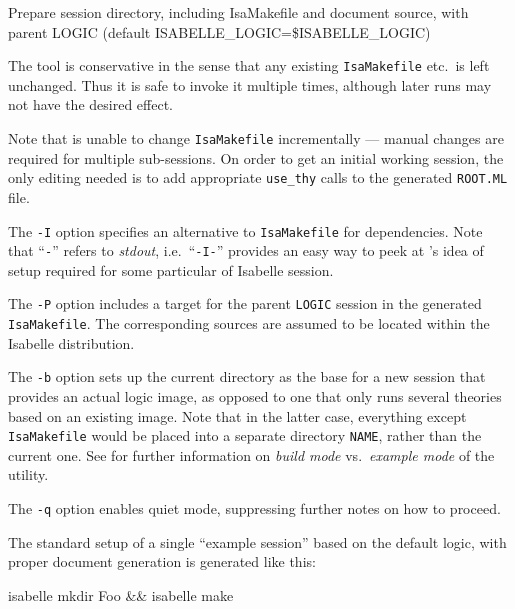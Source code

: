 \begin{isabellebody}
\begin{isamarkuptext}
\begin{ttbox}
  Prepare session directory, including IsaMakefile and document source,
  with parent LOGIC (default ISABELLE_LOGIC=\$ISABELLE_LOGIC)
\end{ttbox}

  The \hyperlink{tool.mkdir}{\mbox{}} tool is conservative in the sense that any
  existing \verb|IsaMakefile| etc.\ is left unchanged.  Thus it
  is safe to invoke it multiple times, although later runs may not
  have the desired effect.

  Note that \hyperlink{tool.mkdir}{\mbox{}} is unable to change \verb|IsaMakefile|
  incrementally --- manual changes are required for multiple
  sub-sessions.  On order to get an initial working session, the only
  editing needed is to add appropriate \verb|use_thy| calls to the
  generated \verb|ROOT.ML| file.%
\end{isamarkuptext}%
\isamarkuptrue%
%
\isamarkuptrue%
%
\begin{isamarkuptext}%
The \verb|-I| option specifies an alternative to \verb|IsaMakefile| for dependencies.  Note that ``\verb|-|'' refers
  to \emph{stdout}, i.e.\ ``\verb|-I-|'' provides an easy way
  to peek at \hyperlink{tool.mkdir}{\mbox{}}'s idea of \hyperlink{tool.make}{\mbox{}} setup required for
  some particular of Isabelle session.

  \medskip The \verb|-P| option includes a target for the
  parent \verb|LOGIC| session in the generated \verb|IsaMakefile|.  The corresponding sources are assumed to be located
  within the Isabelle distribution.

  \medskip The \verb|-b| option sets up the current directory
  as the base for a new session that provides an actual logic image,
  as opposed to one that only runs several theories based on an
  existing image.  Note that in the latter case, everything except
  \verb|IsaMakefile| would be placed into a separate directory
  \verb|NAME|, rather than the current one.  See
   for further information on \emph{build
  mode} vs.\ \emph{example mode} of the \hyperlink{tool.usedir}{\mbox{}} utility.

  \medskip The \verb|-q| option enables quiet mode, suppressing
  further notes on how to proceed.%
\end{isamarkuptext}%
\isamarkuptrue%
%
\isamarkuptrue%
%
\begin{isamarkuptext}%
The standard setup of a single ``example session'' based on the
  default logic, with proper document generation is generated like
  this:
\begin{ttbox}
isabelle mkdir Foo && isabelle make
\end{ttbox}


\end{isamarkuptext}
\end{isabellebody}
